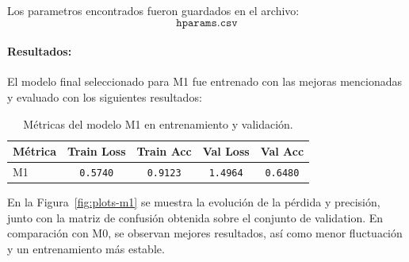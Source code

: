\documentclass[11pt]{article}
\begin{document}
Los parametros encontrados fueron guardados en el archivo: \[\texttt{hparams.csv}\]



\paragraph{Resultados:}

El modelo final seleccionado para M1 fue entrenado con las mejoras mencionadas y evaluado con los siguientes resultados:

\begin{table}[H]
    \centering
    \begin{tabular}{lcccc}
        \hline
        Métrica & Train Loss & Train Acc & Val Loss & Val Acc \\
        \hline
        M1 & \texttt{0.5740} & \texttt{0.9123} & \texttt{1.4964} & \texttt{0.6480} \\
        \hline
    \end{tabular}
    \caption{Métricas del modelo M1 en entrenamiento y validación.}
    \label{tab:metrics-m1}
\end{table}

En la Figura~\ref{fig:plots-m1} se muestra la evolución de la pérdida y precisión, junto con la matriz de confusión obtenida sobre el conjunto de validation. En comparación con M0, se observan mejores resultados, así como menor fluctuación y un entrenamiento más estable.
\end{document}
